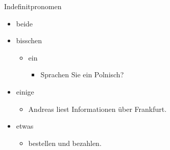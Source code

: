 \begin{syntax}{Indefinitpronomen}{}
\begin{itemize}
	\item beide
	\item bisschen \begin{itemize}
			\item ein  \begin{itemize}
				\item Sprachen Sie ein  Polnisch?
			\end{itemize}
		\end{itemize}
	\item einige \begin{itemize}
			\item Andreas liest  Informationen über Frankfurt.
		\end{itemize}
	\item etwas \begin{itemize}
			\item {} bestellen und bezahlen.
		\end{itemize}
\end{itemize}
\end{syntax}
